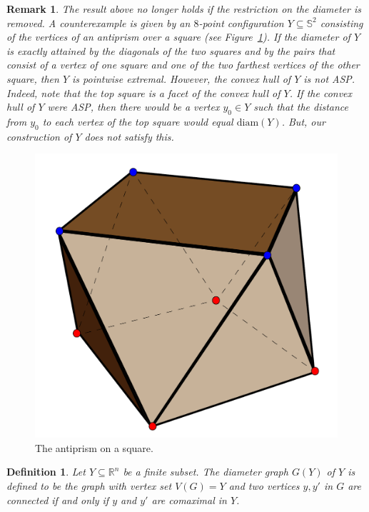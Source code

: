 \documentclass[12pt]{amsart}
\theoremstyle{plain}
\newtheorem{remark}[theorem]{Remark}
\newtheorem{definition}[theorem]{Definition}
\newcommand{\R}{\mathbb{R}}
\newcommand{\Sp}{\mathbb{S}}
\newcommand{\diam}{\mathrm{diam}}
\numberwithin{equation}{section}
\begin{document}
\begin{remark}
The result above no longer holds if the restriction on the diameter is
removed.  A counterexample is given by an $8$-point configuration
$Y\subseteq\Sp^2$ consisting of the vertices of an antiprism over a
square (see Figure~\ref{fig:antiprism}).  If the diameter of $Y$ is
exactly attained by the diagonals of the two squares and by the pairs
that consist of a vertex of one square and one of the two farthest
vertices of the other square, then $Y$ is pointwise extremal.
However, the convex hull of $Y$ is not ASP.  Indeed, note that the top
square is a facet of the convex hull of $Y$.  If the convex hull of
$Y$ were ASP, then there would be a vertex $y_0\in Y$ such that the
distance from $y_0$ to each vertex of the top square would equal
$\diam(Y)$.  But, our construction of $Y$ does not satisfy this.
	
\end{remark}




\begin{figure}[H]
    \centering
    \includegraphics[scale=0.3]{./figures/convex_antiprism.pdf}
    \caption{The antiprism on a square.}
    \label{fig:antiprism}
\end{figure}




\begin{definition}\label{defn:diam_graph}
Let $Y\subseteq\R^n$ be a finite subset.  The \emph{diameter graph}
$G(Y)$ of $Y$ is defined to be the graph with vertex set $V(G) = Y$
and two vertices $y, y'$ in $G$ are connected if and only if $y$ and
$y'$ are comaximal in $Y$.
\end{definition}
\end{document}

